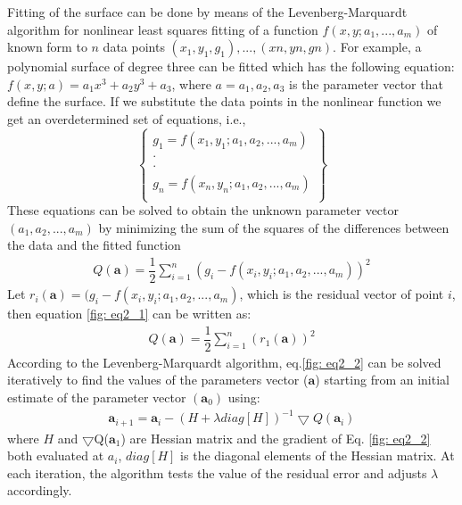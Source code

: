 Fitting of the surface can be done by means of the Levenberg-Marquardt algorithm for nonlinear least squares fitting of a function $f(x, y; a_{1}, ..., a_{m})$ of known form to $n$ data points ${(x_{1}, y_{1}, g_{1}), ...,(xn, yn, gn)}$. For example, a polynomial surface of degree three can be fitted which has the following equation: $f(x, y; a) = a_{1}x^{3} + a_{2}y^{3} + a_{3}$, where $a = {a_{1}, a_{2}, a_{3}}$ is the parameter vector that define the surface. If we substitute the data points in the nonlinear function we get an overdetermined set of equations, i.e.,
\begin{equation}
\begin{Bmatrix}
g_{1} = f(x_{1}, y_{1}; a_{1}, a_{2}, ..., a_{m})\\ 
\cdot                                            \\
\cdot                                            \\ 
g_{n} = f(x_{n}, y_{n}; a_{1}, a_{2}, ..., a_{m})\\ 
\end{Bmatrix}
\end{equation}
These equations can be solved to obtain the unknown parameter vector $(a_{1}, a_{2}, ..., a_{m})$ by minimizing the sum of the squares of the differences between the data and the fitted function
\begin{equation}
\begin{aligned}
Q(\textbf{a})=\dfrac{1}{2} \sum_{i=1}^{n}(g_{i} - f(x_{i},y_{i}; a_{1},a_{2}, ...,a_{m}))^{2}
\label{fig: eq2_1}
\end{aligned}
\end{equation}
Let $r_{i}(\textbf{a}) = (g_{i} - f( x_{i}, y_{i}; a_{1}, a_{2}, ..., a_{m})$, which is the residual vector of point $i$, then equation \ref{fig: eq2_1} can be written as:
\begin{equation}
\begin{aligned}
Q(\textbf{a})=\dfrac{1}{2} \sum_{i=1}^{n}(r_{1}(\textbf{a}))^{2}
\label{fig: eq2_2}
\end{aligned}
\end{equation}
According to the Levenberg-Marquardt algorithm, eq.\ref{fig: eq2_2} can be solved iteratively to find the values of the parameters vector ($\textbf{a}$) starting from an initial estimate of the parameter vector $(\textbf{a}_{0})$ using:
\begin{equation}
\begin{aligned}
\textbf{a}_{i+1} = \textbf{a}_{i} - (H + \lambda diag[H])^{-1} \bigtriangledown Q(\textbf{a}_{i})
\label{fig: eq2_3}
\end{aligned}
\end{equation}
where $H$ and $\bigtriangledown$Q($\textbf{a}_{1}$) are Hessian matrix and the gradient of Eq. \ref{fig: eq2_2} both evaluated at $a_{i}$, $diag[H]$ is the diagonal elements of the Hessian matrix. At each iteration, the algorithm tests the value of the residual error  and adjusts $\lambda$ accordingly. \cite{2a1}